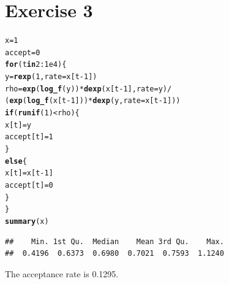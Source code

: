 \documentclass{article}\usepackage[]{graphicx}\usepackage[]{color}
\makeatletter
\newcommand{\hlnum}[1]{\textcolor[rgb]{0.686,0.059,0.569}{#1}}%
\newcommand{\hlopt}[1]{\textcolor[rgb]{0,0,0}{#1}}%
\newcommand{\hlstd}[1]{\textcolor[rgb]{0.345,0.345,0.345}{#1}}%
\newcommand{\hlkwa}[1]{\textcolor[rgb]{0.161,0.373,0.58}{\textbf{#1}}}%
\newcommand{\hlkwb}[1]{\textcolor[rgb]{0.69,0.353,0.396}{#1}}%
\newcommand{\hlkwc}[1]{\textcolor[rgb]{0.333,0.667,0.333}{#1}}%
\newcommand{\hlkwd}[1]{\textcolor[rgb]{0.737,0.353,0.396}{\textbf{#1}}}%
\newenvironment{kframe}{%
 \def\at@end@of@kframe{}%
 \ifinner\ifhmode%
  \def\at@end@of@kframe{\end{minipage}}%
  \begin{minipage}{\columnwidth}%
 \fi\fi%
 \def\FrameCommand##1{\hskip\@totalleftmargin \hskip-\fboxsep
 \colorbox{shadecolor}{##1}\hskip-\fboxsep
     \hskip-\linewidth \hskip-\@totalleftmargin \hskip\columnwidth}%
 \MakeFramed {\advance\hsize-\width
   \@totalleftmargin\z@ \linewidth\hsize
   \@setminipage}}%
 {\par\unskip\endMakeFramed%
 \at@end@of@kframe}
\newenvironment{knitrout}{}{} %
\makeatother
\begin{document}
\section*{Exercise 3}
\begin{knitrout}
\color{fgcolor}\begin{kframe}
\begin{alltt}
\hlstd{x} \hlkwb{=} \hlnum{1}
\hlstd{accept} \hlkwb{=} \hlnum{0}
\hlkwa{for}\hlstd{(t} \hlkwa{in} \hlnum{2}\hlopt{:}\hlnum{1e4}\hlstd{)\{}
  \hlstd{y} \hlkwb{=} \hlkwd{rexp}\hlstd{(}\hlnum{1}\hlstd{,} \hlkwc{rate} \hlstd{= x[t}\hlopt{-}\hlnum{1}\hlstd{])}
  \hlstd{rho} \hlkwb{=} \hlkwd{exp}\hlstd{(}\hlkwd{log_f}\hlstd{(y))}\hlopt{*}\hlkwd{dexp}\hlstd{(x[t}\hlopt{-}\hlnum{1}\hlstd{],} \hlkwc{rate} \hlstd{= y)}\hlopt{/}
    \hlstd{(}\hlkwd{exp}\hlstd{(}\hlkwd{log_f}\hlstd{(x[t}\hlopt{-}\hlnum{1}\hlstd{]))}\hlopt{*}\hlkwd{dexp}\hlstd{(y,} \hlkwc{rate} \hlstd{= x[t}\hlopt{-}\hlnum{1}\hlstd{]))}
    \hlkwa{if}\hlstd{(}\hlkwd{runif}\hlstd{(}\hlnum{1}\hlstd{)}\hlopt{<}\hlstd{rho)\{}
      \hlstd{x[t]} \hlkwb{=} \hlstd{y}
      \hlstd{accept[t]} \hlkwb{=} \hlnum{1}
    \hlstd{\}}
    \hlkwa{else}\hlstd{\{}
      \hlstd{x[t]} \hlkwb{=}\hlstd{x[t}\hlopt{-}\hlnum{1}\hlstd{]}
      \hlstd{accept[t]} \hlkwb{=} \hlnum{0}
  \hlstd{\}}
\hlstd{\}}
\hlkwd{summary}\hlstd{(x)}
\end{alltt}
\begin{verbatim}
##    Min. 1st Qu.  Median    Mean 3rd Qu.    Max. 
##  0.4196  0.6373  0.6980  0.7021  0.7593  1.1240
\end{verbatim}
\end{kframe}
\end{knitrout}
The acceptance rate is 0.1295.
\end{document}

